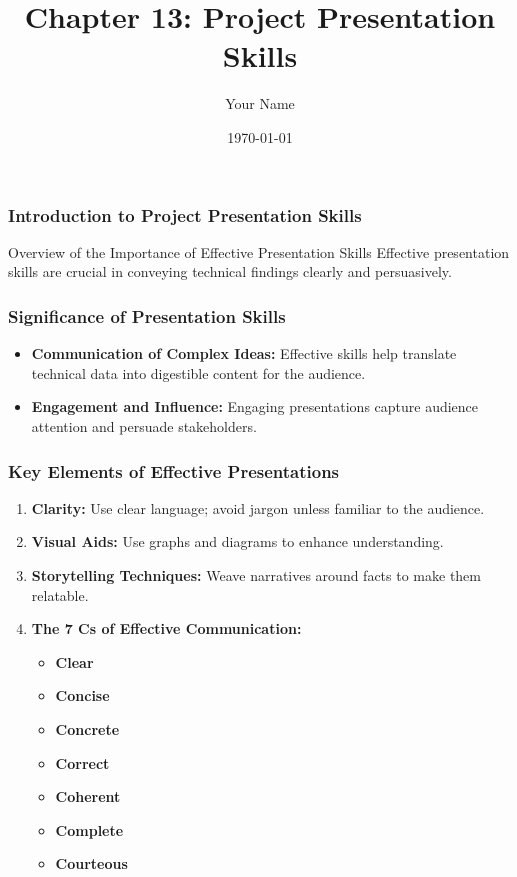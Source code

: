 \documentclass[aspectratio=169]{beamer}
\title[Project Presentation Skills]{Chapter 13: Project Presentation Skills}
\author[Your Name]{Your Name}
\institute[University Name]{
  Department Name\\
  University Name\\
}
\date{\today}
\begin{document}
\frame{\titlepage}

\begin{frame}[fragile]
    \frametitle{Introduction to Project Presentation Skills}
    \begin{block}{Overview of the Importance of Effective Presentation Skills}
        Effective presentation skills are crucial in conveying technical findings clearly and persuasively. 
    \end{block}
\end{frame}

\begin{frame}[fragile]
    \frametitle{Significance of Presentation Skills}
    \begin{itemize}
        \item \textbf{Communication of Complex Ideas:} 
        Effective skills help translate technical data into digestible content for the audience.
        
        \item \textbf{Engagement and Influence:} 
        Engaging presentations capture audience attention and persuade stakeholders.
    \end{itemize}
\end{frame}

\begin{frame}[fragile]
    \frametitle{Key Elements of Effective Presentations}
    \begin{enumerate}
        \item \textbf{Clarity:} 
        Use clear language; avoid jargon unless familiar to the audience.
        
        \item \textbf{Visual Aids:} 
        Use graphs and diagrams to enhance understanding.
        
        \item \textbf{Storytelling Techniques:} 
        Weave narratives around facts to make them relatable.
        
        \item \textbf{The 7 Cs of Effective Communication:}
        \begin{itemize}
            \item \textbf{Clear}
            \item \textbf{Concise}
            \item \textbf{Concrete}
            \item \textbf{Correct}
            \item \textbf{Coherent}
            \item \textbf{Complete}
            \item \textbf{Courteous}
        \end{itemize}
    \end{enumerate}
\end{frame}
\end{document}
